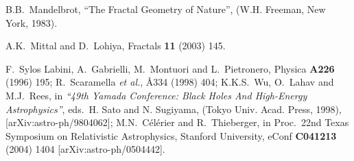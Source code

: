 \documentclass[12pt]{iopart}
\begin{document}
\begin{thebibliography}{66}
B.B.~Mandelbrot,
{``The Fractal Geometry of Nature''},
(W.H. Freeman, New York, 1983).

A.K.~Mittal and D.~Lohiya,
Fractals {\bf 11} (2003) 145. %

F.~Sylos Labini, A.~Gabrielli, M.~Montuori and L.~Pietronero,
Physica {\bf A226} (1996) 195; %
R.~Scaramella {\it et al.},
\AA{334} (1998) 404; %
K.K.S.~Wu, O.~Lahav and M.J.~Rees,
in {\em``49th Yamada Conference: Black Holes And High-Energy Astrophysics''},
eds.\ H. Sato and N. Sugiyama, (Tokyo Univ. Acad. Press, 1998),
[arXiv:astro-ph/9804062];
M.N.~C\'el\'erier and R.~Thieberger,
in Proc.\ 22nd Texas Symposium on Relativistic Astrophysics, Stanford
University, eConf {\bf C041213} (2004) 1404 [arXiv:astro-ph/0504442].
\end{thebibliography}
\end{document}
